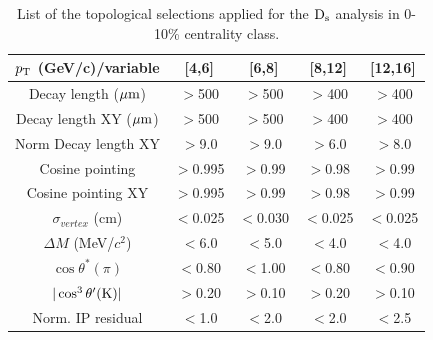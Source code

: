 \begin{table}[!h]
 \begin{center}
  \begin{tabular}{|c|c|c|c|c|}
\hline
$p_{\rm T}$ (GeV/c)/variable &  [4,6] & [6,8] & [8,12] & [12,16] \\
\hline
\hline
Decay length ($\mathrm{\mu m}$)        & $>$500 & $>$500 & $>$400 & $>$400\\
\hline
Decay length XY ($\mathrm{\mu m}$)     & $>$500 & $>$500 & $>$400 & $>$400\\
\hline
Norm Decay length XY          & $>$9.0 & $>$9.0 & $>$6.0 & $>$8.0\\
\hline
Cosine pointing              & $>$0.995 & $>$0.99 & $>$0.98 & $>$0.99\\
\hline
Cosine pointing XY        & $>$0.995 & $>$0.99 & $>$0.98 & $>$0.99\\
\hline
$\sigma_{vertex}$  (cm)          &  $<$0.025 & $<$0.030 & $<$0.025 & $<$0.025\\
\hline
$\Delta M$ (MeV/$c^{2}$) & $<$6.0 & $<$5.0 & $<$4.0 & $<$4.0\\
\hline
$\cos \theta^*(\pi)$    &$<$0.80 & $<$1.00 & $<$0.80 & $<$0.90\\
\hline
$|\cos^3 \theta^\prime({\rm K})|$        & $>$0.20 & $>$0.10 & $>$0.20 & $>$0.10\\
\hline
Norm. IP residual   & $<$1.0 & $<$2.0 & $<$2.0 & $<$2.5 \\
\hline
  \end{tabular}
 \caption{List of the topological selections applied for the
   ${\rm D_s}$ analysis in 0-10\% centrality class.}
 \label{tab:topologicalselections_ds_010}
 \end{center}
\end{table} 

